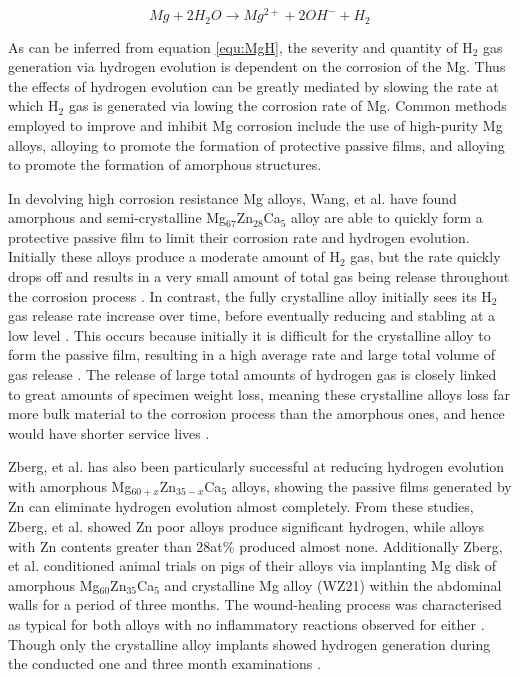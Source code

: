\documentclass[a4paper,12pt,oneside]{report}%
\begin{document}
\begin{equation}
Mg + 2H_{2}O \rightarrow Mg^{2+} + 2OH^{-} + H_{2}
\label{equ:MgH}
\end{equation}

As can be inferred from equation \ref{equ:MgH}, the severity and quantity of H$_{2}$ gas generation via hydrogen evolution is dependent on the corrosion of the Mg. Thus the effects of hydrogen evolution can be greatly mediated by slowing the rate at which H$_{2}$ gas is generated via lowing the corrosion rate of Mg.  Common methods employed to improve and inhibit Mg corrosion include the use of high-purity Mg alloys, alloying to promote the formation of protective passive films, and alloying to promote the formation of amorphous structures. 

In devolving high corrosion resistance Mg alloys, Wang, et al. \cite{Wang2012} have found amorphous and semi-crystalline Mg$_{67}$Zn$_{28}$Ca$_{5}$  alloy are able to quickly form a protective passive film to limit their corrosion rate and hydrogen evolution. Initially these alloys produce a moderate amount of H$_{2}$ gas, but the rate quickly drops off and results in a very small amount of total gas being release throughout the corrosion process \cite{Wang2012}. In contrast, the fully crystalline alloy initially sees its H$_{2}$ gas release rate increase over time, before eventually reducing and stabling at a low level \cite{Wang2012}. This occurs because initially it is difficult for the crystalline alloy to form the passive film, resulting in a high average rate and large total volume of gas release \cite{Wang2012}. The release of large total amounts of hydrogen gas is closely linked to great amounts of specimen weight loss, meaning these crystalline alloys loss far more bulk material to the corrosion process than the amorphous ones, and hence would have shorter service lives \cite{Wang2012}. 

Zberg, et al. \cite{Zberg2009} has also been particularly successful at reducing hydrogen evolution with amorphous Mg$_{60+x}$Zn$_{35-x}$Ca$_{5}$ alloys, showing the passive films generated by Zn can eliminate hydrogen evolution almost completely. From these studies, Zberg, et al. \cite{Zberg2009} showed Zn poor alloys produce significant hydrogen, while alloys with Zn contents greater than 28at\% produced almost none. Additionally Zberg, et al. \cite{Zberg2009} conditioned animal trials on pigs of their alloys via implanting Mg disk of amorphous Mg$_{60}$Zn$_{35}$Ca$_{5}$ and crystalline Mg alloy (WZ21) within the abdominal walls for a period of three months. The wound-healing process was characterised as typical for both alloys with no inflammatory reactions observed for either \cite{Zberg2009}. Though only the crystalline alloy implants showed hydrogen generation during the conducted one and three month examinations \cite{Zberg2009}.
\end{document}
